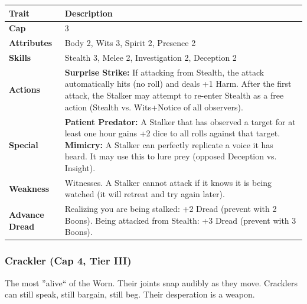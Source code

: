 \documentclass[11pt]{article}
\begin{document}
\begin{center}
\begin{longtable}{|p{3cm}|p{10cm}|}
\hline
\rowcolor{tableheader}
\textbf{Trait} & \textbf{Description} \\
\hline
\textbf{Cap} & 3 \\
\hline
\textbf{Attributes} & Body 2, Wits 3, Spirit 2, Presence 2 \\
\hline
\textbf{Skills} & Stealth 3, Melee 2, Investigation 2, Deception 2 \\
\hline
\textbf{Actions} & \textbf{Surprise Strike:} If attacking from Stealth, the attack automatically hits (no roll) and deals +1 Harm. After the first attack, the Stalker may attempt to re-enter Stealth as a free action (Stealth vs. Wits+Notice of all observers). \\
\hline
\textbf{Special} & \textbf{Patient Predator:} A Stalker that has observed a target for at least one hour gains +2 dice to all rolls against that target. \textbf{Mimicry:} A Stalker can perfectly replicate a voice it has heard. It may use this to lure prey (opposed Deception vs. Insight). \\
\hline
\textbf{Weakness} & Witnesses. A Stalker cannot attack if it knows it is being watched (it will retreat and try again later). \\
\hline
\textbf{Advance Dread} & Realizing you are being stalked: +2 Dread (prevent with 2 Boons). Being attacked from Stealth: +3 Dread (prevent with 3 Boons). \\
\hline
\end{longtable}
\end{center}

\subsubsection{Crackler (Cap 4, Tier III)}

The most ''alive`` of the Worn. Their joints snap audibly as they move. Cracklers can still speak, still bargain, still beg. Their desperation is a weapon.
\end{document}
